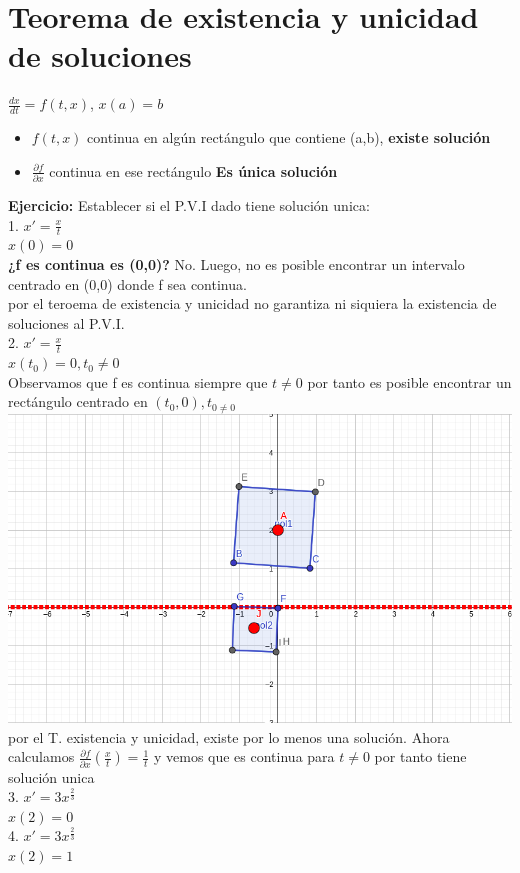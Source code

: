 \documentclass{book}
\begin{document}
    \section{Teorema de existencia y unicidad de soluciones}
    $\frac{dx}{dt} = f(t,x)$, $x(a)=b$
    \begin{itemize}
        \item $f(t,x)$ continua en algún rectángulo que contiene (a,b), \textbf{existe solución}
        \item $\frac{\partial f }{\partial x}$ continua en ese rectángulo \textbf{Es única solución}
    \end{itemize}
    \textbf{Ejercicio:} Establecer si el P.V.I dado tiene solución unica: \\ 
    1. $x'= \frac{x}{t} $ \\ $x(0)=0$ \\ \textbf{¿f es continua es (0,0)?} No. Luego, no es posible encontrar un intervalo centrado en (0,0)
    donde f sea continua. \\ 
    por el teroema de existencia y unicidad no garantiza ni siquiera la existencia de soluciones al P.V.I. \\ 
    2. $x'= \frac{x}{t} $ \\ $x(t_{0})=0, t_{0} \not = 0$ \\ 
    Observamos que f es continua siempre que $t \not = 0$ por tanto es posible encontrar un rectángulo centrado 
    en $(t_{0}, 0), t_{0 \not = 0 }$ \\ 
    \includegraphics[scale=0.4]{imagenes/PVI_01.png}\\ 
    por el T. existencia y unicidad, existe por lo menos una solución. 
    Ahora calculamos $\frac{\partial f }{\partial x}(\frac{x}{t})= \frac{1}{t}$ y vemos que es continua para $t \not = 0$ por tanto tiene solución unica
    \\ 
    3.  $x'= 3x^{\frac{2}{3}} $ \\ $x(2)=0$ \\ 
    4. $x'= 3x^{\frac{2}{3}} $ \\ $x(2)=1$ \\ 
\end{document}
